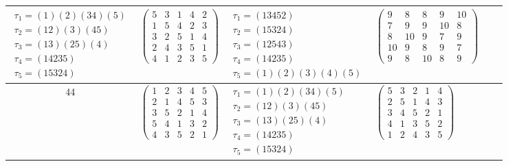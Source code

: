 \begin{longtable}{|c|p{2.7cm}|p{2.7cm}|p{2.7cm}|p{2.7cm}|p{3.3cm}|}
    $\begin{array}{l}\tau_{1}=(1)(2)(34)(5)\\ \tau_{2}=(12)(3)(45)\\ \tau_{3}=(13)(25)(4)\\ \tau_{4}=(14235)\\ \tau_{5}=(15324)\end{array}$     &
    $\begin{pmatrix}5&3&1&4&2\\1&5&4&2&3\\3&2&5&1&4\\2&4&3&5&1\\4&1&2&3&5\end{pmatrix}$                                                         &
    $\begin{array}{l}\tau_{1}=(13452)\\ \tau_{2}=(15324)\\ \tau_{3}=(12543)\\ \tau_{4}=(14235)\\ \tau_{5}=(1)(2)(3)(4)(5)\end{array}$           &
    $\begin{pmatrix}9&8&8&9&10\\7&9&9&10&8\\8&10&9&7&9\\10&9&8&9&7\\9&8&10&8&9\end{pmatrix}$                                                                                                                                \\
    \hline
    44                                                                                                                                          &
    $\begin{pmatrix}1&2&3&4&5\\2&1&4&5&3\\3&5&2&1&4\\5&4&1&3&2\\4&3&5&2&1\end{pmatrix}$                                                         &
    $\begin{array}{l}\tau_{1}=(1)(2)(34)(5)\\ \tau_{2}=(12)(3)(45)\\ \tau_{3}=(13)(25)(4)\\ \tau_{4}=(14235)\\ \tau_{5}=(15324)\end{array}$     &
    $\begin{pmatrix}5&3&2&1&4\\2&5&1&4&3\\3&4&5&2&1\\4&1&3&5&2\\1&2&4&3&5\end{pmatrix}$                                                         &

\end{longtable}
